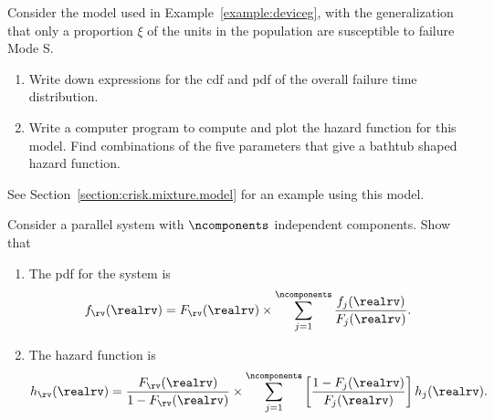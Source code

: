 \begin{exercise2}
Consider the model used in Example~\ref{example:deviceg}, with the
generalization
that only a proportion $\xi$ of the units in the population are
susceptible to
failure Mode S.
\begin{enumerate}
\item
Write down expressions for the cdf and pdf of the overall failure time
distribution.
\item
Write a computer program to compute and plot the hazard function
for this model. Find combinations of the five parameters that
give a bathtub shaped hazard function.
\end{enumerate}
See Section~\ref{section:crisk.mixture.model} for an example using
this model.
\end{exercise2}

\begin{exercise1}
Consider a parallel system with 
$\ncomponents$ independent components. Show that
\begin{enumerate}
\item
The pdf for the system is 
\begin{displaymath}
f_{\rv}(\realrv)=
F_{\rv}(\realrv) \times \sum_{j=1}^{\ncomponents} 
\frac{
    f_{j}(\realrv)
     }
     {
    F_{j}(\realrv)
     }.
\end{displaymath}
\item
The hazard function is
\begin{displaymath}
h_{\rv}(\realrv)=
\frac{F_{\rv}(\realrv)}
     {1- F_{\rv}(\realrv)}
\times \sum_{j=1}^{\ncomponents} 
\left [
\frac{
    1-F_{j}(\realrv)
     }
     {
    F_{j}(\realrv)
     }
\right ] h_{j}(\realrv).
\end{displaymath}
\end{enumerate}
\end{exercise1}

